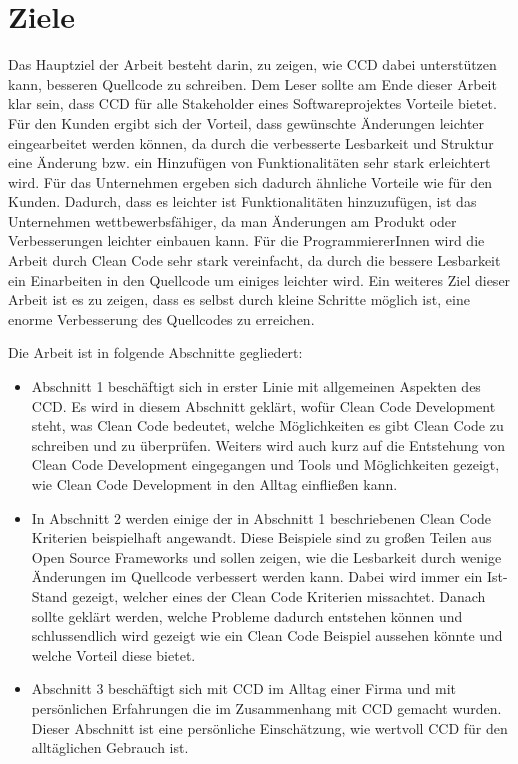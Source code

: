 \section{Ziele}
Das Hauptziel der Arbeit besteht darin, zu zeigen, wie CCD dabei unterstützen kann, besseren Quellcode zu schreiben. Dem Leser sollte am Ende dieser Arbeit klar sein, dass CCD für alle Stakeholder eines Softwareprojektes Vorteile bietet. Für den Kunden ergibt sich der Vorteil, dass gewünschte Änderungen leichter eingearbeitet werden können, da durch die verbesserte Lesbarkeit und Struktur eine Änderung bzw. ein Hinzufügen von Funktionalitäten sehr stark erleichtert wird. Für das Unternehmen ergeben sich dadurch ähnliche Vorteile wie für den Kunden. Dadurch, dass es leichter ist Funktionalitäten hinzuzufügen, ist das Unternehmen wettbewerbsfähiger, da man Änderungen am Produkt oder Verbesserungen leichter einbauen kann. Für die ProgrammiererInnen wird die Arbeit durch Clean Code sehr stark vereinfacht, da durch die bessere Lesbarkeit ein Einarbeiten in den Quellcode um einiges leichter wird. Ein weiteres Ziel dieser Arbeit ist es zu zeigen, dass es selbst durch kleine Schritte möglich ist, eine enorme Verbesserung des Quellcodes zu erreichen. 

Die Arbeit ist in folgende Abschnitte gegliedert:
\begin{itemize}
	\item Abschnitt 1 beschäftigt sich in erster Linie mit allgemeinen Aspekten des CCD. Es wird in diesem Abschnitt geklärt, wofür Clean Code Development steht, was Clean Code bedeutet, welche Möglichkeiten es gibt Clean Code zu schreiben und zu überprüfen. Weiters wird auch kurz auf die Entstehung von Clean Code Development eingegangen und Tools und Möglichkeiten gezeigt, wie Clean Code Development in den Alltag einfließen kann.
	\item In Abschnitt 2 werden einige der in Abschnitt 1 beschriebenen Clean Code Kriterien beispielhaft angewandt. Diese Beispiele sind zu großen Teilen aus Open Source Frameworks und sollen zeigen, wie die Lesbarkeit durch wenige Änderungen im Quellcode verbessert werden kann. Dabei wird immer ein Ist-Stand gezeigt, welcher eines der Clean Code Kriterien missachtet. Danach sollte geklärt werden, welche Probleme dadurch entstehen können und schlussendlich wird gezeigt wie ein Clean Code Beispiel aussehen könnte und welche Vorteil diese bietet.
	\item Abschnitt 3 beschäftigt sich mit CCD im Alltag einer Firma und mit persönlichen Erfahrungen die im Zusammenhang mit CCD gemacht wurden. Dieser Abschnitt ist eine persönliche Einschätzung, wie wertvoll CCD für den alltäglichen Gebrauch ist.
\end{itemize}

